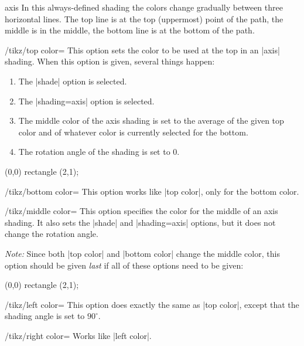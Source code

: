 \begin{shading}{axis}
    In this always-defined shading the colors change gradually between three
    horizontal lines. The top line is at the top (uppermost) point of the path,
    the middle is in the middle, the bottom line is at the bottom of the path.
    \begin{key}{/tikz/top color=}
        This option sets the color to be used at the top in an |axis| shading.
        When this option is given, several things happen:
        \begin{enumerate}
            \item The |shade| option is selected.
            \item The |shading=axis| option is selected.
            \item The middle color of the axis shading is set to the average of
                the given top color  and of whatever color is
                currently selected for the bottom.
            \item The rotation angle of the shading is set to 0.
        \end{enumerate}
\begin{codeexample}[preamble={\usepgflibrary{shadings}}]
\tikz \draw[top color=red] (0,0) rectangle (2,1);
\end{codeexample}
    \end{key}

    \begin{key}{/tikz/bottom color=}
        This option works like |top color|, only for the bottom color.
    \end{key}

    \begin{key}{/tikz/middle color=}
        This option specifies the color for the middle of an axis shading. It
        also sets the |shade| and |shading=axis| options, but it does not
        change the rotation angle.

        \emph{Note:} Since both |top color| and |bottom color| change the
        middle color, this option should be given \emph{last} if all of these
        options need to be given:
\begin{codeexample}[preamble={\usepgflibrary{shadings}}]
\tikz \draw[top color=white,bottom color=black,middle color=red]
  (0,0) rectangle (2,1);
\end{codeexample}
    \end{key}

    \begin{key}{/tikz/left color=}
        This option does exactly the same as |top color|, except that the
        shading angle is set to $90^\circ$.
    \end{key}

    \begin{key}{/tikz/right color=}
        Works like |left color|.
    \end{key}
\end{shading}


